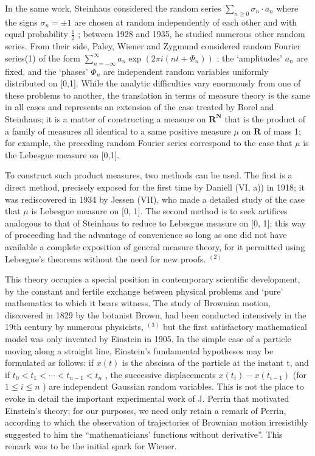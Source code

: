 In the same work, Steinhaus considered the random series \(\sum_{n\geqslant 0}\sigma_n\cdot a_n\) where the signs \(\sigma_{n} = \pm 1\) are chosen at random independently of each other and with equal probability \(\frac{1}{2}\) ; between 1928 and 1935, he studied numerous other random series. From their side, Paley, Wiener and Zygmund considered random Fourier series(1) of the form \(\sum_{n = -\infty}^{\infty}a_n\exp (2\pi i(nt + \Phi_n))\) ; the `amplitudes' \(a_{n}\) are fixed, and the `phases' \(\Phi_{n}\) are independent random variables uniformly distributed on {[}0,1{]}. While the analytic difficulties vary enormously from one of these problems to another, the translation in terms of measure theory is the same in all cases and represents an extension of the case treated by Borel and Steinhaus; it is a matter of constructing a measure on \(\mathbf{R}^{\mathbf{N}}\) that is the product of a family of measures all identical to a same positive measure \(\mu\) on \(\mathbf{R}\) of mass 1; for example, the preceding random Fourier series correspond to the case that \(\mu\) is the Lebesgue measure on {[}0,1{]}.

To construct such product measures, two methods can be used. The first is a direct method, precisely exposed for the first time by Daniell (VI, a)) in 1918; it was rediscovered in 1934 by Jessen (VII), who made a detailed study of the case that \(\mu\) is Lebesgue measure on {[}0, 1{]}. The second method is to seek artifices analogous to that of Steinhaus to reduce to Lebesgue measure on {[}0, 1{]}; this way of proceeding had the advantage of convenience so long as one did not have available a complete exposition of general measure theory, for it permitted using Lebesgue's theorems without the need for new proofs. \(^{(2)}\)


This theory occupies a special position in contemporary scientific development, by the constant and fertile exchange between physical problems and `pure' mathematics to which it bears witness. The study of Brownian motion, discovered in 1829 by the botanist Brown, had been conducted intensively in the 19th century by numerous physicists, \(^{(3)}\) but the first satisfactory mathematical model was only invented by Einstein in 1905. In the simple case of a particle moving along a straight line, Einstein's fundamental hypotheses may be formulated as follows: if \(x(t)\) is the abscissa of the particle at the instant t, and if \(t_{0} < t_{1} < \cdots < t_{n-1} < t_{n}\) , the successive displacements \(x(t_{i}) - x(t_{i-1})\) (for \(1 \leqslant i \leqslant n\) ) are independent Gaussian random variables. This is not the place to evoke in detail the important experimental work of J. Perrin that motivated Einstein's theory; for our purposes, we need only retain a remark of Perrin, according to which the observation of trajectories of Brownian motion irresistibly suggested to him the ``mathematicians' functions without derivative''. This remark was to be the initial spark for Wiener.

